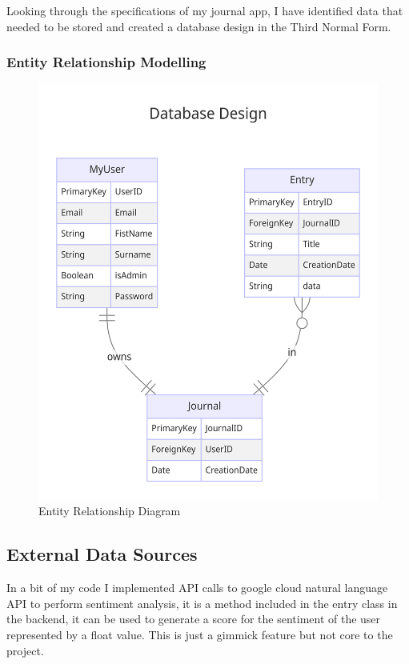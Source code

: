 Looking through the specifications of my journal app, I have identified data that needed to be stored and created a database design in the Third Normal Form.

\subsubsection{Entity Relationship Modelling}
\begin{figure}[!hbt]
    \centering
    \includegraphics[width=\linewidth]{Assets/Journal Hierarchy ER diagram-2024-03-18-085346.png}
    \caption{Entity Relationship Diagram}
    \label{fig:ER}
\end{figure}



\subsection{External Data Sources}
In a bit of my code I implemented API calls to google cloud natural language API to perform sentiment analysis, it is a method included in the entry class in the backend, it can be used to generate a score for the sentiment of the user represented by a float value. This is just a gimmick feature but not core to the project.


